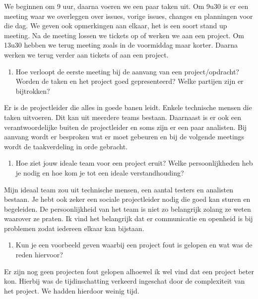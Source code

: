 \documentclass{hogent-article}
\begin{document}
     We beginnen om 9 uur, daarna voeren we een paar taken uit. Om 9u30 is er een meeting waar we overleggen over issues, vorige issues, changes en planningen voor die dag. We geven ook opmerkingen aan elkaar, het is een soort stand up meeting. Na de meeting lossen we tickets op of werken we aan een project. Om 13u30 hebben we terug meeting zoals in de voormiddag maar korter. Daarna werken we terug verder aan tickets of aan een project.\\  
     
     
     \begin{enumerate}[resume]\bfseries
         \item Hoe verloopt de eerste meeting bij de aanvang van een project/opdracht? Worden de taken en het project goed gepresenteerd? Welke partijen zijn er bijtrokken? 
     \end{enumerate} 
 
      Er is de projectleider die alles in goede banen leidt. Enkele technische mensen die taken uitvoeren. Dit kan uit meerdere teams bestaan. Daarnaast is er ook een verantwoordelijke buiten de projectleider en soms zijn er een paar analisten. Bij aanvang wordt er besproken wat er moet gebeuren en bij de volgende meetings wordt de taakverdeling in orde gebracht.\\
    
    \begin{enumerate}[resume]\bfseries
        \item Hoe ziet jouw ideale team voor een project eruit? Welke persoonlijkheden heb je nodig en hoe kom je tot een ideale verstandhouding?  
    \end{enumerate}
    Mijn ideaal team zou uit technische mensen, een aantal testers en analisten bestaan. Je hebt ook zeker een sociale projectleider nodig die goed kan sturen en begeleiden. De persoonlijkheid van het team is niet zo belangrijk zolang ze weten waarover ze praten. Ik vind het belangrijk dat er communicatie en openheid is bij problemen zodat iedereen elkaar kan bijstaan.\\
    
    \begin{enumerate}[resume]\bfseries
        \item Kun je een voorbeeld geven waarbij een project fout is gelopen en wat was de reden hiervoor?  
    \end{enumerate}

    Er zijn nog geen projecten fout gelopen alhoewel ik wel vind dat een project beter kon. Hierbij was de tijdinschatting verkeerd ingeschat door de complexiteit van het project. We hadden hierdoor weinig tijd.\\
    
\end{document}
